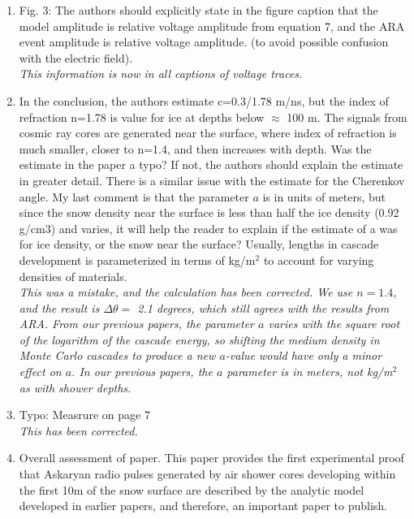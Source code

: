 \documentclass[amsmath,amssymb,aps,prd,10pt,twocolumn,showkeys]{revtex4}
\begin{document}
\begin{enumerate}
\item Fig. 3:  The authors should explicitly state in the figure caption that the model amplitude is relative voltage amplitude from equation 7, and the ARA event amplitude is relative voltage amplitude.  (to avoid possible confusion with the electric field). \\

\textit{This information is now in all captions of voltage traces.}

\item In the conclusion, the authors estimate c=0.3/1.78 m/ns, but the index of refraction n=1.78 is value for ice at depths below $\approx$ 100 m.  The signals from cosmic ray cores are generated near the surface, where index of refraction is much smaller, closer to n=1.4, and then increases with depth.  Was the estimate in the paper a typo?  If not, the authors should explain the estimate in greater detail.  There is a similar issue with the estimate for the Cherenkov angle.  My last comment is that the parameter $a$ is in units of meters, but since the snow density near the surface is less than half the ice density (0.92 g/cm3) and varies, it will help the reader to explain if the estimate of a was for ice density, or the snow near the surface?  Usually, lengths in cascade development is parameterized in terms of kg/m$^2$ to account for varying densities of materials. \\

\textit{This was a mistake, and the calculation has been corrected.  We use $n=1.4$, and the result is $\Delta \theta =$ 2.1 degrees, which still agrees with the results from ARA.  From our previous papers, the parameter $a$ varies with the square root of the logarithm of the cascade energy, so shifting the medium density in Monte Carlo cascades to produce a new $a$-value would have only a minor effect on $a$.  In our previous papers, the $a$ parameter is in meters, not kg/m$^2$ as with shower depths.}

\item Typo: Measrure on page 7 \\

\textit{This has been corrected.}

\item Overall assessment of paper.  This paper provides the first experimental proof that Askaryan radio pulses generated by air shower cores developing within the first 10m of the snow surface are described by the analytic model developed in earlier papers, and  therefore, an important paper to publish.

\end{enumerate}
\end{document}
